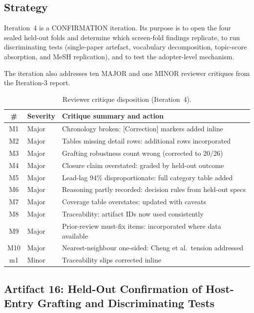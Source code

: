 \documentclass[11pt,letterpaper]{article}
\begin{document}
\subsection{Strategy}

Iteration~4 is a CONFIRMATION iteration. Its purpose is to open the four sealed held-out folds and determine which screen-fold findings replicate, to run discriminating tests (single-paper artefact, vocabulary decomposition, topic-score absorption, and MeSH replication), and to test the adopter-level mechanism.

The iteration also addresses ten MAJOR and one MINOR reviewer critiques from the Iteration-3 report.

\begin{table}[!htbp]
\centering
\caption{Reviewer critique disposition (Iteration~4).}
\label{tab:critiques}
{\small
\begin{tabular}{clL{7.5cm}}
\toprule
\# & Severity & Critique summary and action \\
\midrule
M1 & Major & Chronology broken: [Correction] markers added inline \\
M2 & Major & Tables missing detail rows: additional rows incorporated \\
M3 & Major & Grafting robustness count wrong (corrected to 20/26) \\
M4 & Major & Closure claim overstated: graded by held-out outcome \\
M5 & Major & Lead-lag 94\% disproportionate: full category table added \\
M6 & Major & Reasoning partly recorded: decision rules from held-out specs \\
M7 & Major & Coverage table overstates: updated with caveats \\
M8 & Major & Traceability: artifact IDs now used consistently \\
M9 & Major & Prior-review must-fix items: incorporated where data available \\
M10 & Major & Nearest-neighbour one-sided: Cheng et al.\ tension addressed \\
m1 & Minor & Traceability slips corrected inline \\
\bottomrule
\end{tabular}
}
\end{table}

\subsection{Artifact 16: Held-Out Confirmation of Host-Entry Grafting and Discriminating Tests}
\end{document}
